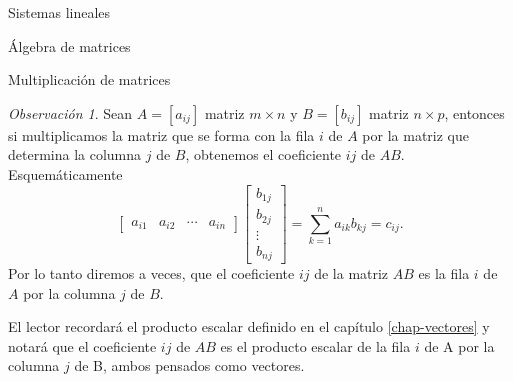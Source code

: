 \documentclass[a4paper,12pt,twoside,spanish,reqno]{amsbook}
\theoremstyle{definition}
\theoremstyle{remark}
\newtheorem{obs}{Observaci\'on}[section]
\begin{document}
\begin{chapter}{Sistemas lineales}
\begin{section}{Álgebra de matrices}
\begin{subsection}{Multiplicación de matrices}
                
                \begin{obs}\label{mtrx-filasxcols}
                     Sean $A=[a_{ij}]$ matriz $m \times n$ y $B=[b_{ij}]$ matriz $n \times p$, entonces si 
                     multiplicamos la matriz que se forma con la fila $i$ de $A$ por la matriz que determina la columna $j$ de $B$, obtenemos el coeficiente $ij$ de $AB$.
                    Esquemáticamente
                    \begin{equation*}
                    \begin{bmatrix} a_{i1}& a_{i2}& \cdots &a_{in}\end{bmatrix}
                    \begin{bmatrix} b_{1j}\\ b_{2j}\\ \vdots \\b_{nj}\end{bmatrix} =  \sum_{k=1}^{n}a_{ik}b_{kj} = c_{ij}.
                    \end{equation*}
                    Por lo tanto diremos a veces, que el coeficiente $ij$ de la matriz $AB$ es la fila $i$ de $A$ por la columna $j$ de $B$. 
                    
                    El lector recordará el producto escalar definido en  el capítulo \ref{chap-vectores} y notará que el coeficiente $ij$ de $AB$ es el producto escalar de la fila $i$ de A por la columna $j$ de B, ambos pensados como vectores. 
                \end{obs}	
                

\end{subsection}
\end{section}
\end{chapter}
\end{document}
